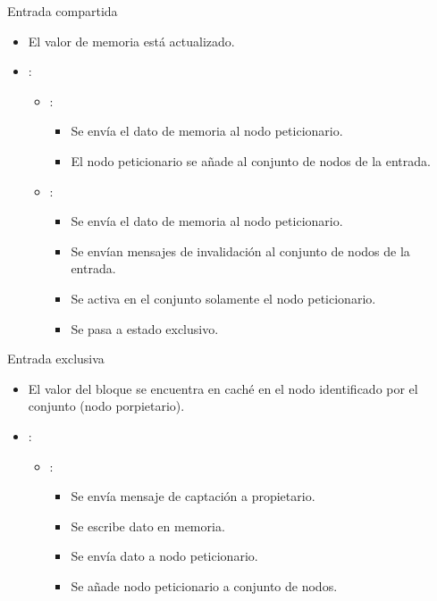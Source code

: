\begin{frame}[t]{Entrada compartida}
\begin{itemize}
  \item El valor de memoria está actualizado.

  \item {}:
    \begin{itemize}

      \item {}:
        \begin{itemize}
          \item Se envía el dato de memoria al nodo peticionario.
          \item El nodo peticionario se añade al conjunto de nodos de la entrada.
        \end{itemize}

      \item {}:
        \begin{itemize}
          \item Se envía el dato de memoria al nodo peticionario.
          \item Se envían mensajes de invalidación al conjunto de nodos de la entrada.
          \item Se activa en el conjunto solamente el nodo peticionario.
          \item Se pasa a estado exclusivo.
        \end{itemize}
    \end{itemize}
\end{itemize}
\end{frame}

\begin{frame}[t]{Entrada exclusiva}
\begin{itemize}
  \item El valor del bloque se encuentra en caché en el nodo identificado por el conjunto (nodo porpietario).

  \item {}:
    \begin{itemize}
      \item {}:
        \begin{itemize}
          \item Se envía mensaje de captación a propietario.
          \item Se escribe dato en memoria.
          \item Se envía dato a nodo peticionario.
          \item Se añade nodo peticionario a conjunto de nodos.
        \end{itemize}
    \end{itemize}
\end{itemize}
\end{frame}

